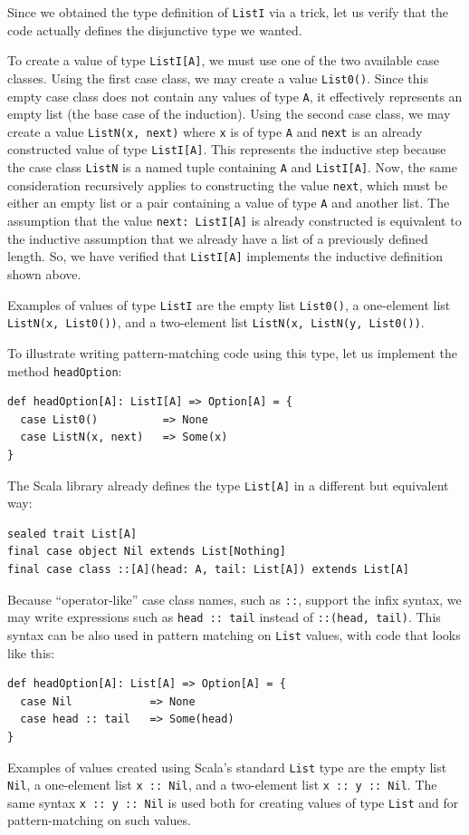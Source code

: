 Since we obtained the type definition of \lstinline!ListI! via a
trick, let us verify that the code actually defines the disjunctive
type we wanted. 

To create a value of type \lstinline!ListI[A]!, we must use one of
the two available case classes. Using the first case class, we may
create a value \lstinline!List0()!. Since this empty case class does
not contain any values of type \lstinline!A!, it effectively represents
an empty list (the base case of the induction). Using the second case
class, we may create a value \lstinline!ListN(x, next)! where \lstinline!x!
is of type \lstinline!A! and \lstinline!next! is an already constructed
value of type \lstinline!ListI[A]!. This represents the inductive
step because the case class \lstinline!ListN! is a named tuple containing
\lstinline!A! and \lstinline!ListI[A]!. Now, the same consideration
recursively applies to constructing the value \lstinline!next!, which
must be either an empty list or a pair containing a value of type
\lstinline!A! and another list. The assumption that the value \lstinline!next: ListI[A]!
is already constructed is equivalent to the inductive assumption that
we already have a list of a previously defined length. So, we have
verified that \lstinline!ListI[A]! implements the inductive definition
shown above.

Examples of values of type \lstinline!ListI! are the empty list \lstinline!List0()!,
a one-element list \lstinline!ListN(x, List0())!, and a two-element
list \lstinline!ListN(x, ListN(y, List0())!.

To illustrate writing pattern-matching code using this type, let us
implement the method \lstinline!headOption!:
\begin{lstlisting}
def headOption[A]: ListI[A] => Option[A] = {
  case List0()          => None
  case ListN(x, next)   => Some(x)
}
\end{lstlisting}

The Scala library already defines the type \lstinline!List[A]! in
a different but equivalent way:
\begin{lstlisting}
sealed trait List[A]
final case object Nil extends List[Nothing]
final case class ::[A](head: A, tail: List[A]) extends List[A]
\end{lstlisting}
Because \textsf{``}operator-like\textsf{''} case class names, such as \lstinline!::!,
support the infix syntax, we may write expressions such as \lstinline!head :: tail!
instead of \lstinline!::(head, tail)!. This syntax can be also used
in pattern matching on \lstinline!List! values, with code that looks
like this:
\begin{lstlisting}
def headOption[A]: List[A] => Option[A] = {
  case Nil            => None
  case head :: tail   => Some(head)
}
\end{lstlisting}
Examples of values created using Scala\textsf{'}s standard \lstinline!List!
type are the empty list \lstinline!Nil!, a one-element list \lstinline!x :: Nil!,
and a two-element list \lstinline!x :: y :: Nil!. The same syntax
\lstinline!x :: y :: Nil! is used both for creating values of type
\lstinline!List! and for pattern-matching on such values. 

